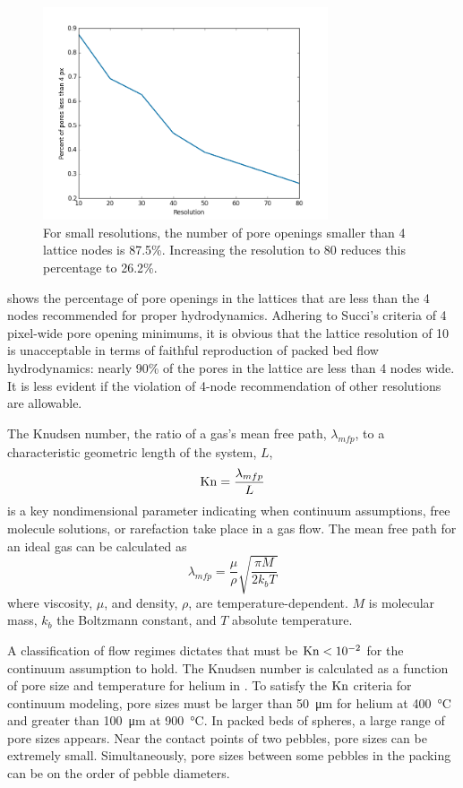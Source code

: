 \begin{figure}[h]
    \centering
    \includegraphics[width=0.75\textwidth]{figures/lbm/percent-pores-under-4px}
    \caption{For small resolutions, the number of pore openings smaller than 4 lattice nodes is 87.5\%. Increasing the resolution to 80 reduces this percentage to 26.2\%.}\label{fig:percent-pores-under-4px}
\end{figure}

 shows the percentage of pore openings in the lattices that are less than the 4 nodes recommended for proper hydrodynamics. Adhering to Succi's criteria of 4 pixel-wide pore opening minimums, it is obvious that the lattice resolution of 10 is unacceptable in terms of faithful reproduction of packed bed flow hydrodynamics: nearly 90\% of the pores in the lattice are less than 4 nodes wide. It is less evident if the violation of 4-node recommendation of other resolutions are allowable. 

The Knudsen number, the ratio of a gas's mean free path, $\lambda_{mfp}$, to a characteristic geometric length of the system, $L$, 
\begin{equation}
\mathrm{Kn} = \frac{\lambda_{mfp}}{L}
\end{equation}
is a key nondimensional parameter indicating when continuum assumptions, free molecule solutions, or rarefaction take place in a gas flow. The mean free path for an ideal gas can be calculated as
\begin{equation}
\lambda_{mfp} = \frac{\mu}{\rho}\sqrt{\frac{\pi M}{2k_bT}}
\end{equation}
where viscosity, $\mu$, and density, $\rho$, are temperature-dependent. $M$ is molecular mass, $k_b$ the Boltzmann constant, and $T$ absolute temperature.

A classification of flow regimes dictates that must be $\mathrm{Kn} < 10^{-2}$ for the continuum assumption to hold.\cite{karniadakis2006microflows} The Knudsen number is calculated as a function of pore size and temperature for helium in . To satisfy the $\mathrm{Kn}$ criteria for continuum modeling, pore sizes must be larger than \SI{50}{\micro\meter} for helium at \SI{400}{\celsius} and greater than \SI{100}{\micro\meter} at \SI{900}{\celsius}. In packed beds of spheres, a large range of pore sizes appears. Near the contact points of two pebbles, pore sizes can be extremely small. Simultaneously, pore sizes between some pebbles in the packing can be on the order of pebble diameters. 

